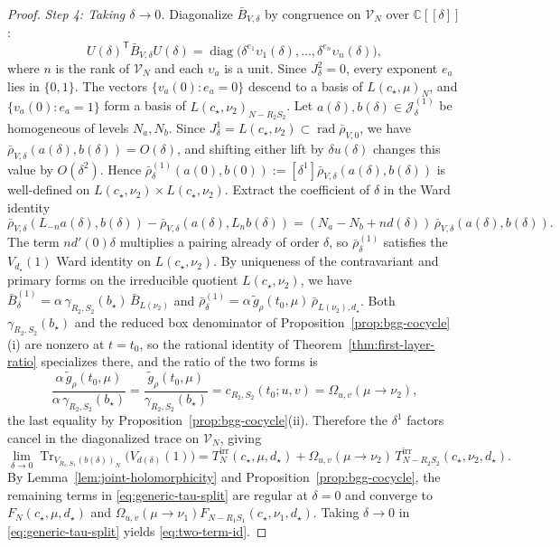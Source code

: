 \documentclass[twoside,10pt]{article}
\numberwithin{equation}{section}
\theoremstyle{slbody}
\theoremstyle{definition}
\theoremstyle{remark}
\newcommand{\Tr}{\operatorname{Tr}}
\newcommand{\rad}{\operatorname{rad}}
\begin{document}
\begin{proof}
\emph{Step 4: Taking \(\delta\to0\).}
Diagonalize \(\bar B_{V,\delta}\) by congruence on \(\mathcal{V}_N\) over
\(\mathbb{C}[[\delta]]\):
\[
 U(\delta)^{\mathsf{T}}\bar B_{V,\delta}U(\delta)
 =\operatorname{diag}\bigl(\delta^{e_1}\upsilon_1(\delta),\ldots,\delta^{e_n}\upsilon_n(\delta)\bigr),
\]
where \(n\) is the rank of \(\mathcal V_N\) and each \(\upsilon_a\) is a unit.  Since \(J_\delta^2=0\), every exponent \(e_a\) lies in
\(\{0,1\}\).  The vectors \(\{v_a(0):e_a=0\}\) descend to a basis of
\(L(c_\star,\mu)_N\), and \(\{v_a(0):e_a=1\}\) form a basis of
\(L(c_\star,\nu_2)_{N-R_2S_2}\).  Let \(a(\delta),b(\delta)\in\mathcal{J}_\delta^{(1)}\)
be homogeneous of levels \(N_a,N_b\).  Since
\(J_\delta^1=L(c_\star,\nu_2)\subset\rad\bar\rho_{V,0}\), we have
\(\bar\rho_{V,\delta}(a(\delta),b(\delta))=O(\delta)\), and shifting either lift by
\(\delta u(\delta)\) changes this value by \(O(\delta^2)\).  Hence
\(\bar\rho^{(1)}_\delta(a(0),b(0)):=[\delta^1]\bar\rho_{V,\delta}(a(\delta),b(\delta))\)
is well-defined on \(L(c_\star,\nu_2)\times L(c_\star,\nu_2)\).  Extract the
coefficient of \(\delta\) in the Ward identity
\[
 \bar\rho_{V,\delta}(L_{-n}a(\delta),b(\delta))-\bar\rho_{V,\delta}(a(\delta),L_nb(\delta))
 =(N_a-N_b+nd(\delta))\,\bar\rho_{V,\delta}(a(\delta),b(\delta)).
\]
The term
\(nd'(0)\delta\) multiplies a pairing already of order \(\delta\), so
\(\bar\rho^{(1)}_\delta\) satisfies the \(V_{d_\star}(1)\) Ward identity
on \(L(c_\star,\nu_2)\).  By uniqueness of the contravariant and primary forms
on the irreducible quotient \(L(c_\star,\nu_2)\), we have
\(\bar B^{(1)}_\delta=\alpha\,\gamma_{R_2,S_2}(b_\star)\,\bar B_{L(\nu_2)}\) and
\(\bar\rho^{(1)}_\delta=\alpha\,\tilde g_\rho(t_0,\mu)\,\bar\rho_{L(\nu_2),d_\star}\).
Both \(\gamma_{R_2,S_2}(b_\star)\) and the reduced box denominator of
Proposition~\ref{prop:bgg-cocycle}(i) are nonzero at \(t=t_0\), so the
rational identity of Theorem~\ref{thm:first-layer-ratio} specializes there,
and the ratio of the two forms is
\[
 \frac{\alpha\,\tilde g_\rho(t_0,\mu)}{\alpha\,\gamma_{R_2,S_2}(b_\star)}
 =\frac{\tilde g_\rho(t_0,\mu)}{\gamma_{R_2,S_2}(b_\star)}
 =c_{R_2,S_2}(t_0;u,v)
 =\Omega_{u,v}(\mu\to\nu_2),
\]
the last equality by Proposition~\ref{prop:bgg-cocycle}(ii).
Therefore the \(\delta^1\) factors cancel in the diagonalized trace on
\(\mathcal{V}_N\), giving
\[
 \lim_{\delta\to0}\Tr_{V_{R_1,S_1}(b(\delta))_N}\bigl(V_{d(\delta)}(1)\bigr)
 =T^{\mathrm{irr}}_N(c_\star,\mu,d_\star)
  +\Omega_{u,v}(\mu\to\nu_2)\,T^{\mathrm{irr}}_{N-R_2S_2}(c_\star,\nu_2,d_\star).
\]
By Lemma~\ref{lem:joint-holomorphicity} and
Proposition~\ref{prop:bgg-cocycle}, the remaining terms in
\eqref{eq:generic-tau-split} are regular at \(\delta=0\) and converge to
\(F_N(c_\star,\mu,d_\star)\) and
\(\Omega_{u,v}(\mu\to\nu_1)F_{N-R_1S_1}(c_\star,\nu_1,d_\star)\).  Taking
\(\delta\to0\) in \eqref{eq:generic-tau-split} yields \eqref{eq:two-term-id}.
\end{proof}
\end{document}
